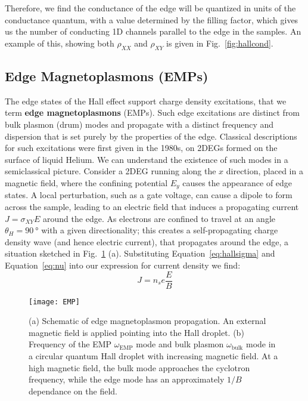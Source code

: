 Therefore, we find the conductance of the edge will be quantized in units of the conductance quantum, with a value determined
by the filling factor, which gives us the number of conducting 1D channels parallel to the edge in the samples. An example of this, showing both $\rho_{XX}$
and $\rho_{XY}$ is given in Fig.~\ref{fig:hallcond}.

\subsection{Edge Magnetoplasmons (EMPs)}
The edge states of the Hall effect support charge density excitations, that we term \textbf{edge magnetoplasmons} (EMPs).
Such edge excitations are distinct from bulk plasmon (drum) modes and propagate with
a distinct frequency and dispersion that is set purely by the properties of the edge. Classical descriptions for such excitations
were first given in the 1980s, on 2DEGs formed on the surface of liquid Helium\cite{PhysRevLett.54.1706,PhysRevB.32.7676,1985ZhPmR..42..450V}.
We can understand the existence of such modes in a semiclassical picture. Consider a 2DEG running along the $x$ direction, placed in a magnetic field,
where the confining potential $E_y$ causes the appearance of edge states. A local perturbation, such as a gate voltage, can cause a dipole to form across
the sample, leading to an electric field that induces a propagating current $J = \sigma_{XY}E$ around the edge. As electrons are confined to travel at an
angle $\theta_H = \SI{90}{\degree}$ with a given directionality; this creates a self-propagating charge density wave (and hence electric current), that propagates
around the edge, a situation sketched in Fig.~\ref{fig:EMP} (a). Substituting Equation~\ref{eq:hallsigma} and Equation~\ref{eq:nu} into our expression for current density we find:
\begin{equation}
  J = n_s e \frac{E}{B}
\end{equation}

\begin{figure}
  \texttt{[image: EMP]}
  \caption[Edge magnetoplasmons]
  {\label{fig:EMP}(a) Schematic of edge magnetoplasmon propagation. An external magnetic field is applied pointing into the Hall droplet.
  (b) Frequency of the EMP $\omega_\textrm{EMP}$ mode and bulk plasmon $\omega_\textrm{bulk}$ mode in a circular quantum Hall droplet with increasing magnetic field. At a high magnetic field, the bulk mode approaches the cyclotron frequency, while the edge mode has an approximately
  $1/B$ dependance on the field.}
\end{figure}

